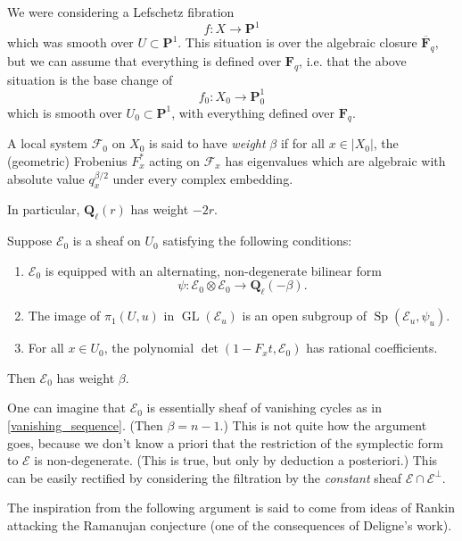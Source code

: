 \documentclass[letterpaper,11pt]{article}
\newcommand{\F}{\mathbf{F}}
\newcommand{\Q}{\mathbf{Q}}
\newcommand{\ol}[1]{\overline{#1}}
\newcommand{\PS}{\mathbf{P}}
\newcommand{\Cal}[1]{\mathcal{#1}}
\DeclareMathOperator{\GL}{GL}
\DeclareMathOperator{\Sp}{Sp}
\begin{document}
 We were considering a Lefschetz fibration 
 \[
f \colon  X \rightarrow \PS^1
 \]
 which was smooth over $U \subset \PS^1$. This situation is over the algebraic closure $\ol{\F}_q$, but we can assume that everything is defined over $\F_q$, i.e. that the above situation is the base change of 
 \[
 f_0 \colon X_0 \rightarrow \PS_0^1
 \]
which is smooth over $U_0 \subset \PS^1$, with everything defined over $\F_q$. 
 
\begin{defn} A local system $\Cal{F}_0$ on $X_0$ is said to have \emph{weight} $\beta$ if for all $x \in |X_0|$, the (geometric) Frobenius $F_x^*$ acting on $\Cal{F}_x$ has eigenvalues which are algebraic with absolute value $q_x^{\beta/2}$ under every complex embedding.
\end{defn}

\begin{example}
 In particular, $\Q_{\ell}(r)$ has weight $-2r$. 
 \end{example}
 

\begin{thm}\label{fundamental}
Suppose $\Cal{E}_0$ is a sheaf on $U_0$ satisfying the following conditions:
\begin{enumerate}
\item $\Cal{E}_0$ is equipped with an alternating, non-degenerate bilinear form 
\[
\psi \colon \Cal{E}_0 \otimes \Cal{E}_0 \rightarrow \Q_{\ell}(-\beta).
\] 
\item The image of $\pi_1(U, u)$ in $\GL(\Cal{E}_u)$ is an open subgroup of $\Sp(\Cal{E}_u, \psi_u)$.
\item For all $x \in U_0$, the polynomial $\det (1-F_x t, \Cal{E}_0)$ has rational coefficients. 
\end{enumerate}
Then $\Cal{E}_0$ has weight $\beta$. 
\end{thm}

\begin{remark}
One can imagine that $\Cal{E}_0$ is essentially sheaf of vanishing cycles as in \eqref{vanishing_sequence}. (Then $\beta=n-1$.) This is not quite how the argument goes, because we don't know a priori that the restriction of the symplectic form to $\Cal{E}$ is non-degenerate. (This is true, but only by deduction a posteriori.) This can be easily rectified by considering the filtration by the \emph{constant} sheaf $\Cal{E} \cap \Cal{E}^{\perp}$. 
\end{remark}

The inspiration from the following argument is said to come from ideas of Rankin attacking the Ramanujan conjecture (one of the consequences of Deligne's work). 
\end{document}
